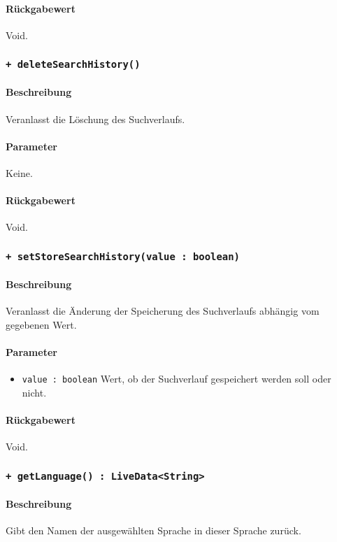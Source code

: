 \paragraph*{Rückgabewert}
Void.

\subsubsection*{\texttt{+ deleteSearchHistory()}}%
\paragraph*{Beschreibung}
Veranlasst die Löschung des Suchverlaufs.
\paragraph*{Parameter}
Keine.
\paragraph*{Rückgabewert}
Void.

\subsubsection*{\texttt{+ setStoreSearchHistory(value : boolean)}}%
\paragraph*{Beschreibung}
Veranlasst die Änderung der Speicherung des Suchverlaufs abhängig vom gegebenen Wert.
\paragraph*{Parameter}
\begin{itemize}
    \item \texttt{value : boolean} Wert, ob der Suchverlauf gespeichert werden soll oder nicht.
\end{itemize}
\paragraph*{Rückgabewert}
Void.

\subsubsection*{\texttt{+ getLanguage() : LiveData<String>}}%
\paragraph*{Beschreibung}
Gibt den Namen der ausgewählten Sprache in dieser Sprache zurück.

